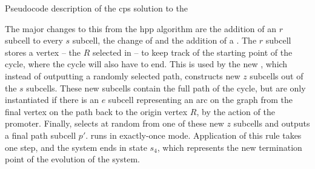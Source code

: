 \begin{algorithm}
\DontPrintSemicolon
{}
\caption{\label{alg:tsp:hcp}Pseudocode description of the \gls{cps} solution to the }
\end{algorithm}

The major changes to this from the \gls{hpp} algorithm are the addition of an \(r\) subcell to every \(s\) subcell, the change of  and the addition of a . The \(r\) subcell stores a vertex -- the \(R\) selected in  -- to keep track of the starting point of the cycle, where the cycle will also have to end.  This is used by the new , which instead of outputting a randomly selected path, constructs new \(z\) subcells out of the \(s\) subcells.  These new subcells contain the full path of the cycle, but are only instantiated if there is an \(e\) subcell representing an arc on the graph from the final vertex on the path back to the origin vertex \(R\), by the action of the \gls{promoter}.  Finally,  selects at random from one of these new \(z\) subcells and outputs a final path subcell \(p'\).   runs in exactly-once mode.  Application of this rule takes one step, and the system ends in state \(s_4\), which represents the new termination point of the evolution of the system.

